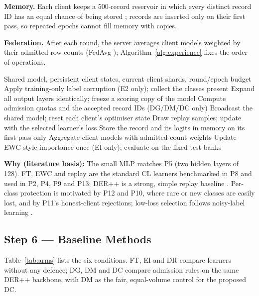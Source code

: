 \documentclass[10pt,a4paper]{article}
\newcommand{\why}[1]{\par\noindent\colorbox{black!5}{\parbox{\dimexpr\linewidth-2\fboxsep}{\small\textbf{Why (literature basis):} #1}}\par}
\begin{document}
\textbf{Memory.} Each client keeps a 500-record reservoir in which every distinct record ID has an equal chance of being stored \cite{vitter}; records are inserted only on their first pass, so repeated epochs cannot fill memory with copies.

\textbf{Federation.} After each round, the server averages client models weighted by their admitted row counts (FedAvg \cite{fedavg}); Algorithm~\ref{alg:experience} fixes the order of operations.

\begin{algorithm}[htbp]
\caption{One supervised stage (experience)}
\label{alg:experience}
\begin{algorithmic}[1]
\Require Shared model, persistent client states, current client shards, round/epoch budget
\State Apply training-only label corruption (E2 only); collect the classes present
\State Expand all output layers identically; freeze a scoring copy of the model
\State Compute admission quotas and the accepted record IDs (DG/DM/DC only)
\State Broadcast the shared model; reset each client's optimiser state
\State Draw replay samples; update with the selected learner's loss
\State Store the record and its logits in memory on its first pass only
\EndFor
\State Aggregate client models with admitted-count weights
\EndFor
\State Update EWC-style importance once (EI only); evaluate on the fixed test banks
\end{algorithmic}
\end{algorithm}

\why{The small MLP matches P5 (two hidden layers of 128). FT, EWC and replay are the standard CL learners benchmarked in P8 and used in P2, P4, P9 and P13; DER++ is a strong, simple replay baseline \cite{der}. Per-class protection is motivated by P12 and P10, where rare or new classes are easily lost, and by P11's honest-client rejections; low-loss selection follows noisy-label learning \cite{coteach,mentornet}.}

\subsection{Step 6 --- Baseline Methods}
Table~\ref{tab:arms} lists the six conditions. FT, EI and DR compare learners without any defence; DG, DM and DC compare admission rules on the same DER++ backbone, with DM as the fair, equal-volume control for the proposed DC.
\end{document}
